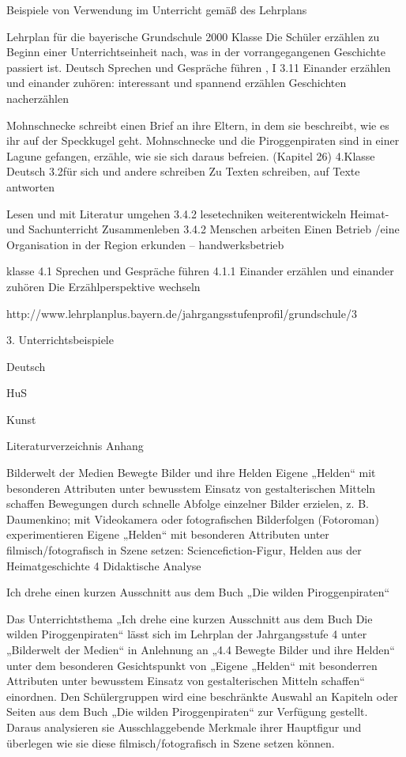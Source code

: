 Beispiele von Verwendung im Unterricht gemäß des Lehrplans

Lehrplan für die bayerische Grundschule 2000
Klasse
Die Schüler erzählen zu Beginn einer Unterrichtseinheit nach, was in der vorrangegangenen Geschichte passiert ist.
Deutsch
Sprechen und Gespräche führen , I
3.11 Einander erzählen und einander zuhören: interessant und spannend erzählen Geschichten nacherzählen

Mohnschnecke schreibt einen Brief an ihre Eltern, in dem sie beschreibt, wie es ihr auf der Speckkugel geht. Mohnschnecke und die Piroggenpiraten sind in einer Lagune gefangen, erzähle, wie sie sich daraus befreien. (Kapitel 26)
4.Klasse
Deutsch
3.2für sich und andere schreiben
Zu Texten schreiben, auf Texte antworten

Lesen und mit Literatur umgehen
3.4.2 lesetechniken weiterentwickeln
Heimat- und Sachunterricht
Zusammenleben   3.4.2 Menschen arbeiten Einen Betrieb /eine Organisation in der Region erkunden   –  handwerksbetrieb


klasse
4.1 Sprechen und Gespräche führen 
4.1.1 Einander erzählen und einander zuhören   
Die Erzählperspektive wechseln

http://www.lehrplanplus.bayern.de/jahrgangsstufenprofil/grundschule/3

3. Unterrichtsbeispiele




Deutsch

HuS

Kunst

Literaturverzeichnis
Anhang


Bilderwelt der Medien
Bewegte Bilder und ihre Helden
Eigene „Helden“ mit besonderen Attributen unter
bewusstem Einsatz von gestalterischen Mitteln
schaffen
Bewegungen durch schnelle Abfolge einzelner Bilder
erzielen, z. B. Daumenkino; mit Videokamera oder
fotografischen Bilderfolgen (Fotoroman)
experimentieren
Eigene „Helden“ mit besonderen Attributen unter
filmisch/fotografisch in Szene setzen:
Sciencefiction-Figur, Helden aus der
Heimatgeschichte
4 Didaktische Analyse

 Ich drehe einen kurzen Ausschnitt aus dem Buch „Die wilden Piroggenpiraten“

Das Unterrichtsthema „Ich drehe eine kurzen Ausschnitt aus dem Buch Die wilden  Piroggenpiraten“ lässt sich im Lehrplan der Jahrgangsstufe 4 unter „Bilderwelt der Medien“ in Anlehnung an „4.4 Bewegte Bilder und ihre Helden“ unter dem besonderen Gesichtspunkt von „Eigene „Helden“ mit besonderren Attributen unter bewusstem Einsatz von gestalterischen Mitteln schaffen“ einordnen. Den Schülergruppen wird eine beschränkte Auswahl an Kapiteln oder Seiten aus dem Buch „Die wilden Piroggenpiraten“ zur Verfügung gestellt. Daraus analysieren sie Ausschlaggebende Merkmale ihrer Hauptfigur und überlegen wie sie diese filmisch/fotografisch in Szene setzen können.

